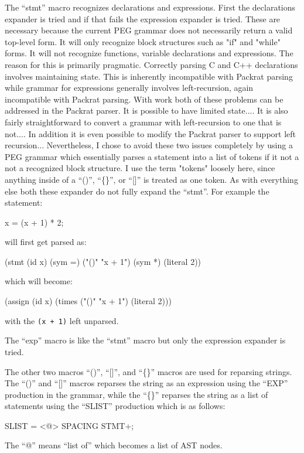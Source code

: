 \documentclass[12pt,english,letterpaper]{article}
\begin{document}
The ``stmt'' macro recognizes declarations and expressions.  First the
declarations expander is tried and if that fails the expression
expander is tried.  These are necessary because the current PEG
grammar does not necessarily return a valid top-level form.  It will
only recognize block structures such as "if" and "while" forms.  It
will not recognize functions, variable declarations and expressions.
The reason for this is primarily pragmatic.  Correctly parsing C and
C++ declarations involves maintaining state.  This is inherently
incompatible with Packrat parsing while grammar for expressions
generally involves left-recursion, again incompatible with Packrat
parsing.  With work both of these problems can be addressed in the
Packrat parser.  It is possible to have limited state....  It is also
fairly straightforward to convert a grammar with left-recursion to one
that is not....  In addition it is even possible to modify the Packrat
parser to support left recursion...  Nevertheless, I chose to avoid
these two issues completely by using a PEG grammar which essentially
parses a statement into a list of tokens if it not a not a recognized
block structure.  I use the term "tokens" loosely here, since anything
inside of a ``()'', ``\{\}'', or ``[]'' is treated as one token.  As
with everything else both these expander do not fully expand the
``stmt''.  For example the statement:
\begin{code}
x = (x + 1) * 2;
\end{code}
will first get parsed as:
\begin{code}
(stmt (id x) (sym =) ("()" "x + 1") (sym *) (literal 2))
\end{code}
which will become:
\begin{code}
(assign (id x) (times ("()" "x + 1") (literal 2)))
\end{code}
with the \verb/(x + 1)/ left unparsed.

The ``exp'' macro is like the ``stmt'' macro but only the expression
expander is tried.

The other two macros ``()'', ``[]'', and ``\{\}'' macros are used for
reparsing strings.  The ``()'' and ``[]'' macros reparses the string
as an expression using the ``EXP'' production in the grammar, while
the ``\{\}'' reparses the string as a list of statements using the
``SLIST'' production which is as follows:
\begin{code}
SLIST = <@> SPACING {STMT}+;
\end{code}
The ``@'' means ``list of'' which becomes a list of AST nodes. 
\end{document}
